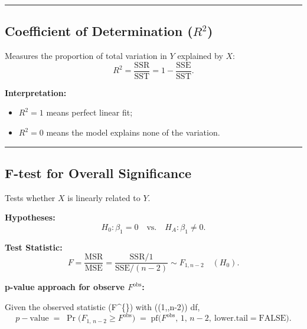 \documentclass[
  letterpaper,
]{scrbook}
\providecommand{\tightlist}{%
  \setlength{\itemsep}{0pt}\setlength{\parskip}{0pt}}\usepackage{longtable,booktabs,array}
\begin{document}
\begin{center}\rule{0.5\linewidth}{0.5pt}\end{center}

\subsection{\texorpdfstring{Coefficient of Determination
(\(R^2\))}{Coefficient of Determination (R\^{}2)}}\label{coefficient-of-determination-r2}

Measures the proportion of total variation in \(Y\) explained by \(X\):
\[
R^2 = \frac{\mathrm{SSR}}{\mathrm{SST}}
= 1 - \frac{\mathrm{SSE}}{\mathrm{SST}}.
\]

\textbf{Interpretation:}

\begin{itemize}
\tightlist
\item
  \(R^2 = 1\) means perfect linear fit;
\item
  \(R^2 = 0\) means the model explains none of the variation.
\end{itemize}

\begin{center}\rule{0.5\linewidth}{0.5pt}\end{center}

\subsection{F-test for Overall
Significance}\label{f-test-for-overall-significance}

Tests whether \(X\) is linearly related to \(Y\).

\textbf{Hypotheses:} \[
H_0: \beta_1 = 0
\quad \text{vs.} \quad
H_A: \beta_1 \ne 0.
\]

\textbf{Test Statistic:} \[
F = \frac{\text{MSR}}{\text{MSE}}
= \frac{\text{SSR}/1}{\text{SSE}/(n-2)}
\sim F_{1,n-2}\quad (H_0).
\]

\textbf{p-value approach for observe \(F^{\mathrm{obs}}\):}

Given the observed statistic (F\^{}\{\}) with ((1,,n-2)) df,
\[
p-\text{value} \;=\; \Pr\!\big(F_{1,\,n-2} \ge F^{\text{obs}}\big)
\;=\; \mathrm{pf}\!\big(F^{\text{obs}},\,1,\,n-2,\ \text{lower.tail}= \mathrm{FALSE}\big).
\]
\end{document}
